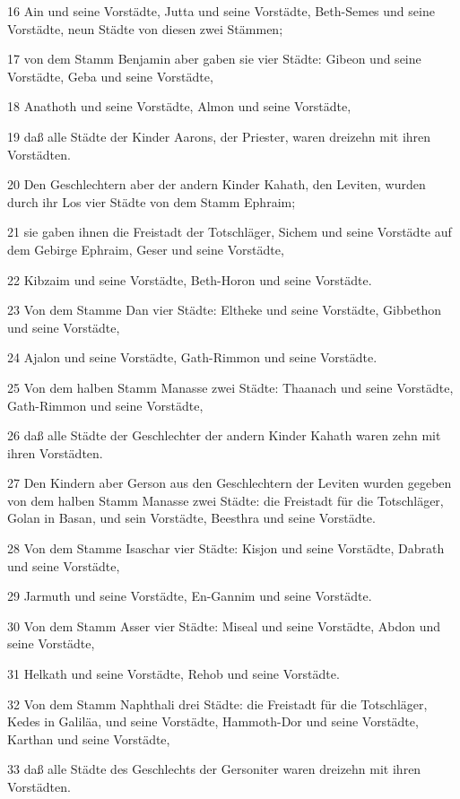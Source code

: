 \par 16 Ain und seine Vorstädte, Jutta und seine Vorstädte, Beth-Semes und seine Vorstädte, neun Städte von diesen zwei Stämmen;
\par 17 von dem Stamm Benjamin aber gaben sie vier Städte: Gibeon und seine Vorstädte, Geba und seine Vorstädte,
\par 18 Anathoth und seine Vorstädte, Almon und seine Vorstädte,
\par 19 daß alle Städte der Kinder Aarons, der Priester, waren dreizehn mit ihren Vorstädten.
\par 20 Den Geschlechtern aber der andern Kinder Kahath, den Leviten, wurden durch ihr Los vier Städte von dem Stamm Ephraim;
\par 21 sie gaben ihnen die Freistadt der Totschläger, Sichem und seine Vorstädte auf dem Gebirge Ephraim, Geser und seine Vorstädte,
\par 22 Kibzaim und seine Vorstädte, Beth-Horon und seine Vorstädte.
\par 23 Von dem Stamme Dan vier Städte: Eltheke und seine Vorstädte, Gibbethon und seine Vorstädte,
\par 24 Ajalon und seine Vorstädte, Gath-Rimmon und seine Vorstädte.
\par 25 Von dem halben Stamm Manasse zwei Städte: Thaanach und seine Vorstädte, Gath-Rimmon und seine Vorstädte,
\par 26 daß alle Städte der Geschlechter der andern Kinder Kahath waren zehn mit ihren Vorstädten.
\par 27 Den Kindern aber Gerson aus den Geschlechtern der Leviten wurden gegeben von dem halben Stamm Manasse zwei Städte: die Freistadt für die Totschläger, Golan in Basan, und sein Vorstädte, Beesthra und seine Vorstädte.
\par 28 Von dem Stamme Isaschar vier Städte: Kisjon und seine Vorstädte, Dabrath und seine Vorstädte,
\par 29 Jarmuth und seine Vorstädte, En-Gannim und seine Vorstädte.
\par 30 Von dem Stamm Asser vier Städte: Miseal und seine Vorstädte, Abdon und seine Vorstädte,
\par 31 Helkath und seine Vorstädte, Rehob und seine Vorstädte.
\par 32 Von dem Stamm Naphthali drei Städte: die Freistadt für die Totschläger, Kedes in Galiläa, und seine Vorstädte, Hammoth-Dor und seine Vorstädte, Karthan und seine Vorstädte,
\par 33 daß alle Städte des Geschlechts der Gersoniter waren dreizehn mit ihren Vorstädten.
